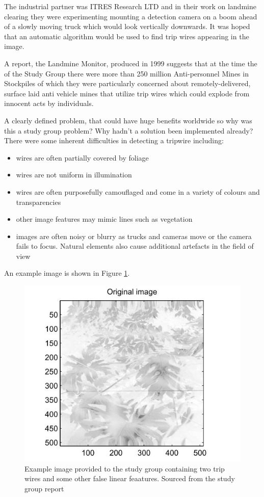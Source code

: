 \documentclass[11pt]{article} %
\begin{document}
The industrial partner was ITRES Research LTD and in their work on landmine clearing they were experimenting mounting a detection camera on a boom ahead of a slowly moving truck which would look vertically downwards. It was hoped that an automatic algorithm would be used to find trip wires appearing in the image. 
	
	A report, the Landmine Monitor, produced in 1999 \cite{landmine} suggests that at the time the of the Study Group there were more than 250 million Anti-personnel Mines in Stockpiles of which they were particularly concerned about remotely-delivered, surface laid anti vehicle mines that utilize trip wires which could explode from innocent acts by individuals. 
	
	A clearly defined  problem, that could have huge benefits worldwide so why was this a study group problem? Why hadn't a solution been implemented already? There were some inherent difficulties in detecting a tripwire including:
	\begin{itemize}
	\item wires are often partially covered by foliage
	\item wires are not uniform in illumination 
	\item wires are often purposefully camouflaged and come in a variety of colours and transparencies
	\item other image features may mimic lines such as vegetation 
	\item images are often noisy or blurry as trucks and cameras move or the camera fails to focus. Natural elements also cause additional artefacts in the field of view
	\end{itemize}
	An example image is shown in Figure \ref{fig:landmine-image}.
	
	\begin{figure}
		\centering
		\includegraphics[width=0.7\linewidth]{"Report_images/landmine image"}
		\caption{Example image provided to the study group containing two trip wires and some other false linear feaatures. Sourced from the study group report \cite{Jessop}}
		\label{fig:landmine-image}
	\end{figure}
	
\end{document}
